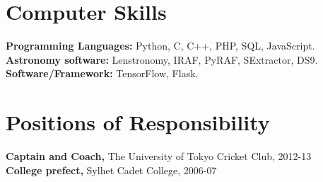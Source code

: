 \documentclass[margin,line]{res}
\newenvironment{list2}{
  \begin{list}{$\bullet$}{%
      \setlength{\itemsep}{0in}
      \setlength{\parsep}{0in} \setlength{\parskip}{0in}
      \setlength{\topsep}{0in} \setlength{\partopsep}{0in} 
      \setlength{\leftmargin}{0.2in}}}{\end{list}}
\begin{document}
\begin{resume}
%
%
%


\section{\sc Computer Skills} 
\textbf{Programming Languages:} Python, C, C++, PHP, SQL, JavaScript.\\
\textbf{Astronomy software:} Lenstronomy, IRAF, PyRAF, SExtractor, DS9. \\
\textbf{Software/Framework:} TensorFlow, Flask.


\section{\sc Positions of Responsibility}
{\bf Captain and Coach,} The University of Tokyo Cricket Club, 2012-13 \\
{\bf College prefect,} Sylhet Cadet College, 2006-07


\end{resume}
\end{document}
